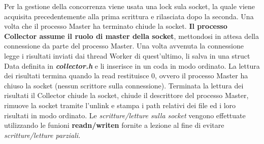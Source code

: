 \documentclass{article}
\begin{document}
Per la gestione della concorrenza viene usata una lock sula socket, la quale viene acquisita precedentemente alla prima scrittura e rilasciata dopo la seconda. Una volta che il processo Master ha terminato chiude la socket.\newline\newline
\textbf{Il processo Collector assume il ruolo di master della socket}, mettondosi in attesa della connessione da parte del processo Master. Una volta avvenuta la connessione legge i risultati inviati dai thread Worker di quest'ultimo, li salva in una struct Data definita in \textit{\textbf{collector.h}} e li inserisce in un coda in modo ordinato. La lettura dei risultati termina quando la read restituisce 0, ovvero il processo Master ha chiuso la socket (nessun scrittore sulla connessione). Terminata la lettura dei risultati il Collector chiude la socket, chiude il descrittore del processo Master, rimuove la socket tramite l'unlink e stampa i path relativi dei file ed i loro risultati in modo ordinato.\newline\newline
Le \textit{scritture/letture sulla socket} vengono effettuate utilizzando le funioni \textbf{readn/writen} fornite a lezione al fine di evitare \textit{scritture/letture parziali.}
\end{document}
